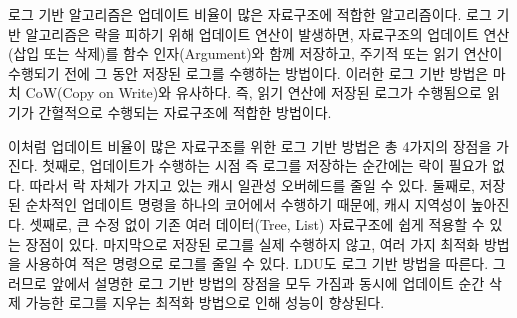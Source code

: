 로그 기반 알고리즘은 업데이트 비율이 많은 자료구조에 적합한 알고리즘이다. 
로그 기반 알고리즘은 락을 피하기 위해 업데이트 연산이 발생하면, 자료구조의 업데이트 
연산(삽입 또는 삭제)를 함수 인자(Argument)와 함께 저장하고, 주기적 또는 읽기 연산이 
수행되기 전에 그 동안 저장된 로그를 수행하는 방법이다.
이러한 로그 기반 방법은 마치 CoW(Copy on Write)와 유사하다.
즉, 읽기 연산에 저장된 로그가 수행됨으로 읽기가 간혈적으로 수행되는 자료구조에 적합한 방법이다.

이처럼 업데이트 비율이 많은 자료구조를 위한 로그 기반 방법은 총 4가지의 장점을 가진다. 
첫째로, 업데이트가 수행하는 시점 즉 로그를 저장하는 순간에는 락이 필요가 없다. 
따라서 락 자체가 가지고 있는 캐시 일관성 오버헤드를 줄일 수 있다. 
둘째로, 저장된 순차적인 업데이트 명령을 하나의 코어에서 수행하기 때문에, 캐시 지역성이 높아진다.
셋째로, 큰 수정 없이 기존 여러 데이터(Tree, List) 자료구조에 쉽게 적용할 수 있는 장점이 있다.
마지막으로 저장된 로그를 실제 수행하지 않고, 여러 가지 최적화 방법을 사용하여 적은 
명령으로 로그를 줄일 수 있다. 
LDU도 로그 기반 방법을 따른다. 그러므로 앞에서 설명한 로그 기반 방법의 장점을 모두 가짐과 동시에
업데이트 순간 삭제 가능한 로그를 지우는 최적화 방법으로 인해 성능이 향상된다.

